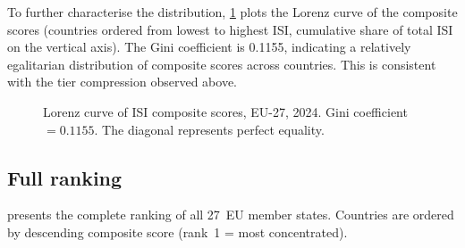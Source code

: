 To further characterise the distribution, \cref{fig:lorenz} plots
the Lorenz curve of the composite scores (countries ordered from
lowest to highest ISI, cumulative share of total ISI on the vertical
axis).  The Gini coefficient is 0.1155, indicating a relatively
egalitarian distribution of composite scores across countries.  This
is consistent with the tier compression observed above.

\begin{figure}[htbp]
\centering

\caption{Lorenz curve of ISI composite scores, EU-27, 2024.
  Gini coefficient $= 0.1155$.  The diagonal represents perfect
  equality.}
\label{fig:lorenz}
\end{figure}

\subsection{Full ranking}\label{sec:ranking}

 presents the complete ranking of all 27~EU member
states.  Countries are ordered by descending composite score (rank~1
= most concentrated).

